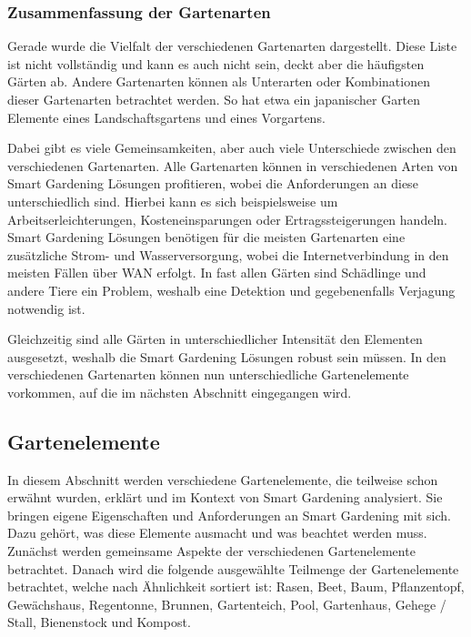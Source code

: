 
\subsubsection{Zusammenfassung der Gartenarten}
Gerade wurde die Vielfalt der verschiedenen Gartenarten dargestellt.
Diese Liste ist nicht vollständig und kann es auch nicht sein, deckt aber die häufigsten Gärten ab.
Andere Gartenarten können als Unterarten oder Kombinationen dieser Gartenarten betrachtet werden.
So hat etwa ein japanischer Garten Elemente eines Landschaftsgartens und eines Vorgartens.

Dabei gibt es viele Gemeinsamkeiten, aber auch viele Unterschiede zwischen den verschiedenen Gartenarten.
Alle Gartenarten können in verschiedenen Arten von Smart Gardening Lösungen profitieren, wobei die Anforderungen an diese unterschiedlich sind.
Hierbei kann es sich beispielsweise um Arbeitserleichterungen, Kosteneinsparungen oder Ertragssteigerungen handeln.
Smart Gardening Lösungen benötigen für die meisten Gartenarten eine zusätzliche Strom- und Wasserversorgung, wobei die Internetverbindung in den meisten Fällen über WAN erfolgt.
In fast allen Gärten sind Schädlinge und andere Tiere ein Problem, weshalb eine Detektion und gegebenenfalls Verjagung notwendig ist.

\pagebreak

Gleichzeitig sind alle Gärten in unterschiedlicher Intensität den Elementen ausgesetzt, weshalb die Smart Gardening Lösungen robust sein müssen.
In den verschiedenen Gartenarten können nun unterschiedliche Gartenelemente vorkommen, auf die im nächsten Abschnitt eingegangen wird.


\subsection{Gartenelemente}
In diesem Abschnitt werden verschiedene Gartenelemente, die teilweise schon erwähnt wurden, erklärt und im Kontext von Smart Gardening analysiert.
Sie bringen eigene Eigenschaften und Anforderungen an Smart Gardening mit sich.
Dazu gehört, was diese Elemente ausmacht und was beachtet werden muss.
Zunächst werden gemeinsame Aspekte der verschiedenen Gartenelemente betrachtet.
Danach wird die folgende ausgewählte Teilmenge der Gartenelemente betrachtet, welche nach Ähnlichkeit sortiert ist: Rasen, Beet, Baum, Pflanzentopf, Gewächshaus, Regentonne, Brunnen, Gartenteich, Pool, Gartenhaus, Gehege / Stall, Bienenstock und Kompost.

